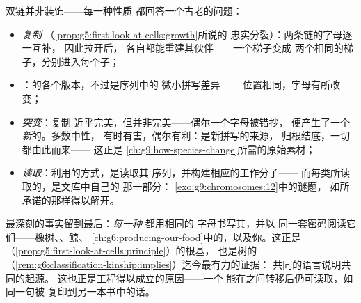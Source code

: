 \begin{proposition}\label{prop:g9:genes-and-dna:explains}
双链并非装饰——每一种性质
都回答一个古老的问题：
\begin{itemize}
  \item \emph{复制}
        （\cref{prop:g5:first-look-at-cells:growth}所说的
        忠实分裂）：两条链的字母逐一互补，
        因此拉开后，
        各自都能重建其伙伴——一个梯子变成
        两个相同的梯子，分别进入每个子；
  \item \emph{}：的各个版本，不过是序列中的
        微小拼写差异——
        位置相同，字母有所改变；
  \item \emph{突变}：复制
        近乎完美，但并非完美——偶尔一个字母被错抄，
        便产生了一个\emph{新}的。多数中性，
        有时有害，偶尔有利：是新拼写的来源，
        归根结底，一切都由此而来——
        这正是
        \cref{ch:g9:how-species-change}所需的原始素材；
  \item \emph{读取}：利用的方式，是读取其
        序列，并构建相应的工作分子——
        而每类所读取的，是文库中自己的
        那一部分：
        \cref{exo:g9:chromosomes:12}中的谜题，
        如所承诺的那样得以解开。
\end{itemize}
\end{proposition}
\admitted

\begin{remark}[万物一码]\label{rem:g9:genes-and-dna:universal}
最深刻的事实留到最后：\emph{每一种}
都用相同的  字母书写其，并以
同一套密码阅读它们——橡树、、鲸、
\cref{ch:g6:producing-our-food}中的，以及你。这正是
（\cref{prop:g5:first-look-at-cells:principle}）的根基，
也是树的
（\cref{rem:g6:classification-kinship:implies}）迄今最有力的证据：
共同的语言说明共同的起源。
这也正是工程得以成立的原因——一个
能在之间转移后仍可读取，如同一句被
复印到另一本书中的话。
\end{remark}

